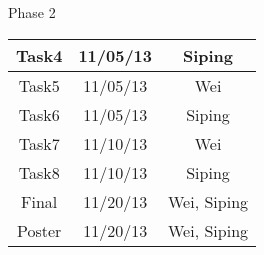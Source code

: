 \begin{center}
Phase 2\\
\begin{tabular}{|c|c|c|}
\hline
Task4 & 11/05/13 & Siping\\\hline
Task5 & 11/05/13 & Wei\\\hline
Task6 & 11/05/13 & Siping\\\hline
Task7 & 11/10/13 & Wei\\\hline
Task8 & 11/10/13 & Siping\\\hline
Final & 11/20/13 & Wei, Siping\\\hline
Poster & 11/20/13 & Wei, Siping\\\hline
\end{tabular}
\end{center}






